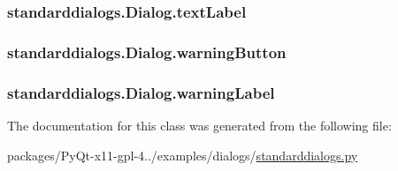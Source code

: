 \subsubsection[{text\+Label}]{\setlength{\rightskip}{0pt plus 5cm}standarddialogs.\+Dialog.\+text\+Label}\label{classstandarddialogs_1_1Dialog_ae0ce9066c4de0fd6fb6b29b8a350a7e7}
\hypertarget{classstandarddialogs_1_1Dialog_a86de91bb464072d4b2120f83d6338b93}{}
\subsubsection[{warning\+Button}]{\setlength{\rightskip}{0pt plus 5cm}standarddialogs.\+Dialog.\+warning\+Button}\label{classstandarddialogs_1_1Dialog_a86de91bb464072d4b2120f83d6338b93}
\hypertarget{classstandarddialogs_1_1Dialog_ac572b8599da899f5cd5fd383f03a781b}{}
\subsubsection[{warning\+Label}]{\setlength{\rightskip}{0pt plus 5cm}standarddialogs.\+Dialog.\+warning\+Label}\label{classstandarddialogs_1_1Dialog_ac572b8599da899f5cd5fd383f03a781b}


The documentation for this class was generated from the following file\+:\begin{DoxyCompactItemize}
\item 
packages/\+Py\+Qt-\/x11-\/gpl-\/4../examples/dialogs/\hyperlink{standarddialogs_8py}{standarddialogs.\+py}\end{DoxyCompactItemize}
